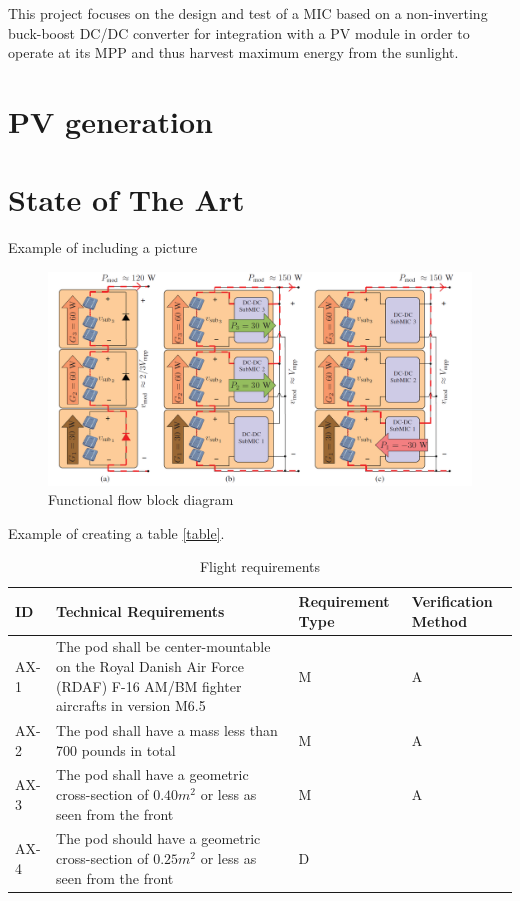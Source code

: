 This project focuses on the design and test of a MIC based on a non-inverting buck-boost DC/DC converter for integration with a PV module in order to operate at its MPP and thus harvest maximum energy from the sunlight. 

\section{PV generation}



\section{State of The Art}

Example of including a picture
\begin{figure}[htbp]
	\includegraphics[width=\linewidth]{../Pictures/test.png}
	\caption{Functional flow block diagram}
	\label{fig:TimePlan}
\end{figure}

Example of creating a table \ref{table}.
\begin{table}[htbp]
	\begin{tabular}{|m{1.5cm}|m{8cm}|m{2.5cm}|m{2.5cm}|}
		\hline
		\rowcolor{lightgray} \textbf{ID} & \textbf{Technical Requirements}  & \textbf{Requirement Type}  &  \textbf{Verification Method}    \\ \hline
		AX-1 & The pod shall be center-mountable on the Royal Danish Air Force (RDAF) F-16 AM/BM fighter aircrafts in version M6.5     & M   & A      \\ \hline
		\rowcolor{Seashell2} AX-2 & The pod shall have a mass less than 700 pounds in total & M  & A        \\ \hline
		AX-3 & The pod shall have a geometric cross-section of $0.40m^2$  or less as seen from the front   &  M   & A                \\ \hline
		\rowcolor{Seashell2} AX-4 & The pod should have a geometric cross-section of $0.25m^2$ or less as seen from the front   &  D   &                \\ \hline
	\end{tabular}
	\caption{Flight requirements}
	\label{tab:TechRequirements}
\end{table}




